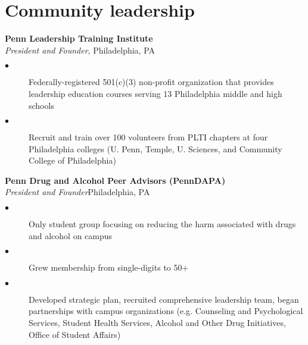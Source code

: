 \documentclass[10pt, letterpaper]{article}
\newcommand{\years}[1]{\marginnote{\normalsize #1}}
\begin{document}


\section*{Community leadership}
\noindent

\years{2014-2017}
\textbf{Penn Leadership Training Institute}\\%
\emph{President and Founder}\hfill, Philadelphia, PA
\begin{description}
    \item[$\bullet$] Federally-registered 501(c)(3) non-profit organization that provides leadership education courses serving 13 Philadelphia middle and high schools
    \item[$\bullet$] Recruit and train over 100 volunteers from PLTI chapters at four Philadelphia colleges (U. Penn, Temple, U. Sciences, and Community College of Philadelphia)
    \\[.2cm]
\end{description}

\years{2014-2017}
\textbf{Penn Drug and Alcohol Peer Advisors (PennDAPA)}\\%
\emph{President and Founder}\hfill Philadelphia, PA
\begin{description}
    \item[$\bullet$] Only student group focusing on reducing the harm associated with drugs and alcohol on campus
    \item[$\bullet$] Grew membership from single-digits to 50+
    \item[$\bullet$] Developed strategic plan, recruited comprehensive leadership team, began partnerships with campus organizations (e.g. Counseling and Psychological Services, Student Health Services, Alcohol and Other Drug Initiatives, Office of Student Affairs)
    \\[.2cm]
\end{description}
\end{document}
